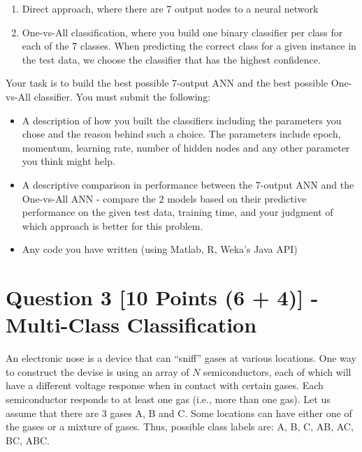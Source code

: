 \documentclass[fontsize=10pt,DIV=14]{scrartcl}
\begin{document}
	\begin{enumerate}
		\item
		Direct approach, where there are 7 output nodes to a neural network

		\item
		One-vs-All classiﬁcation, where you build one binary classiﬁer per class for each of the 7 classes. When predicting the correct class for a given instance in the test data, we choose the classiﬁer that has the highest conﬁdence.

	\end{enumerate}

	Your task is to build the best possible 7-output ANN and the best possible One-vs-All classiﬁer. You must submit the following:

	\begin{itemize}
		\item
		A description of how you built the classiﬁers including the parameters you chose and the reason behind such a choice. The parameters include epoch, momentum, learning rate, number of hidden nodes and any other parameter you think might help.

		\item
		A descriptive comparison in performance between the 7-output ANN and the One-vs-All ANN - compare the 2 models based on their predictive performance on the given test data, training time, and your judgment of which approach is better for this problem.

		\item
		Any code you have written (using Matlab, R, Weka’s Java API)
	\end{itemize}

	\section{Question 3 [10 Points (6 + 4)] - Multi-Class Classiﬁcation}


	An electronic nose is a device that can ``sniff'' gases at various locations. One way to construct the devise is using an array of $N$ semiconductors, each of which will have a different voltage response when in contact with certain gases. Each semiconductor responds to at least one gas (i.e., more than one gas). Let us assume that there are 3 gases A, B and C. Some locations can have either one of the gases or a mixture of gases. Thus, possible class labels are: A, B, C, AB, AC, BC, ABC.
\end{document}
